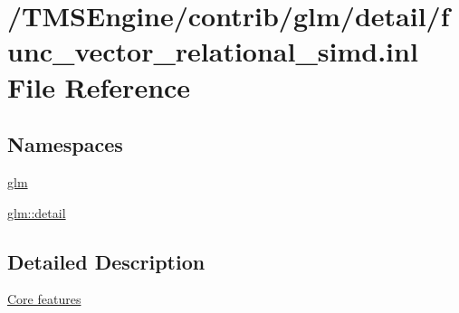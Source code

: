 \hypertarget{func__vector__relational__simd_8inl}{}\section{/\+T\+M\+S\+Engine/contrib/glm/detail/func\+\_\+vector\+\_\+relational\+\_\+simd.inl File Reference}
\label{func__vector__relational__simd_8inl}
\subsection*{Namespaces}
\begin{DoxyCompactItemize}
\item 
 \hyperlink{namespaceglm}{glm}
\item 
 \hyperlink{namespaceglm_1_1detail}{glm\+::detail}
\end{DoxyCompactItemize}


\subsection{Detailed Description}
\hyperlink{group__core}{Core features} 